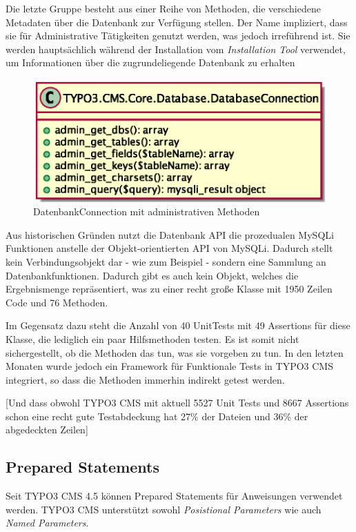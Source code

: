Die letzte Gruppe besteht aus einer Reihe von Methoden, die verschiedene Metadaten über die Datenbank zur Verfügung stellen. Der Name impliziert, dass sie für Administrative Tätigkeiten genutzt werden, was jedoch irreführend ist. Sie werden hauptsächlich während der Installation vom \textit{Installation Tool} verwendet, um Informationen über die zugrundeliegende Datenbank zu erhalten

\begin{figure}[H]
\centering
\includegraphics[scale=0.7]{gfx/uml/DatabaseConnectionAdminMethods.eps}
\caption{DatenbankConnection mit administrativen Methoden}
\label{fig:databaseConnectionWithSQLAdminMethods}
\end{figure}

Aus historischen Gründen nutzt die Datenbank API die prozedualen MySQLi Funktionen anstelle der Objekt-orientierten API von MySQLi. Dadurch stellt\\  kein Verbindungsobjekt dar - wie zum Beispiel  - sondern eine Sammlung an Datenbankfunktionen. Dadurch gibt es auch kein Objekt, welches die Ergebnismenge repräsentiert, was  zu einer recht große Klasse mit 1950 Zeilen Code und 76 Methoden.

Im Gegensatz dazu steht die Anzahl von 40 UnitTests mit 49 Assertions für diese Klasse, die lediglich ein paar Hilfsmethoden testen. Es ist somit nicht sichergestellt, ob die Methoden das tun, was sie vorgeben zu tun. In den letzten Monaten wurde jedoch ein Framework für Funktionale Tests in TYPO3 CMS integriert, so dass die Methoden immerhin indirekt getest werden.

[Und dass obwohl TYPO3 CMS mit aktuell 5527 Unit Tests und 8667 Assertions schon eine recht gute Testabdeckung hat 27\% der Dateien und 36\% der abgedeckten Zeilen]

\subsection{Prepared Statements}
\label{currentsituationsubsec:preparedStatements}
Seit TYPO3 CMS 4.5 können Prepared Statements für  Anweisungen verwendet werden. TYPO3 CMS unterstützt sowohl \textit{Posistional Parameters} wie auch \textit{Named Parameters}.

